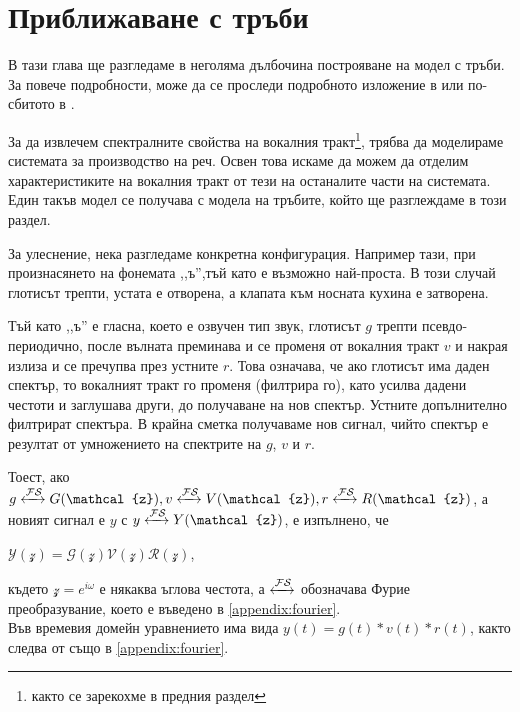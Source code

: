 \documentclass[main.tex]{subfiles}
\begin{document}
\section{Приближаване с тръби}
В тази глава ще разгледаме в неголяма дълбочина построяване на модел с тръби. За повече подробности, може да се проследи подробното изложение в \cite{rabiner_schafer78} или по-сбитото в \cite{taylor:2009}.

За да извлечем спектралните свойства на вокалния тракт\footnote{както се зарекохме в предния раздел}, трябва да моделираме системата за производство на реч. Освен това искаме да можем да отделим характеристиките на вокалния тракт от тези на останалите части на системата. Един такъв модел се получава с модела на тръбите, който ще разглеждаме в този раздел.

За улеснение, нека разгледаме конкретна конфигурация. Например тази, при произнасянето на фонемата ,,ъ'',тъй като е възможно най-проста. В този случай глотисът трепти, устата е отворена, а клапата към носната кухина е затворена.

Тъй като ,,ъ'' е гласна, което е озвучен тип звук, глотисът $g$ трепти псевдо-периодично, после вълната преминава и се променя от вокалния тракт $v$ и накрая излиза и се пречупва през устните $r$. Това означава, че ако глотисът има даден спектър, то вокалният тракт го променя (филтрира го), като усилва дадени честоти и заглушава други, до получаване на нов спектър. Устните допълнително филтрират спектъра. В крайна сметка получаваме нов сигнал, чийто спектър е резултат от умножението на спектрите на $g$, $v$ и $r$.

Тоест, ако $g \xleftrightarrow{\mathcal{F}\mathcal{S}} G(\mathcal{z}), v \xleftrightarrow{\mathcal{F}\mathcal{S}} V(\mathcal{z}), r \xleftrightarrow{\mathcal{F}\mathcal{S}} R(\mathcal{z})$, а новият сигнал е $y$ с $y \xleftrightarrow{\mathcal{F}\mathcal{S}} Y(\mathcal{z})$, е изпълнено, че

$\mathcal{Y}(\mathcal{z}) = \mathcal{G}(\mathcal{z}) \mathcal{V}(\mathcal{z}) \mathcal{R}(\mathcal{z})$,

където $\mathcal{z} = e^{i\omega}$ е някаква ъглова честота, а $\xleftrightarrow{\mathcal{F}\mathcal{S}}$ обозначава Фурие преобразувание, което е въведено в \autoref{appendix:fourier}.\\

Във времевия домейн уравнението има вида $y(t) = g(t)\ast v(t)\ast r(t)$, както следва от  също в \autoref{appendix:fourier}.
\end{document}

